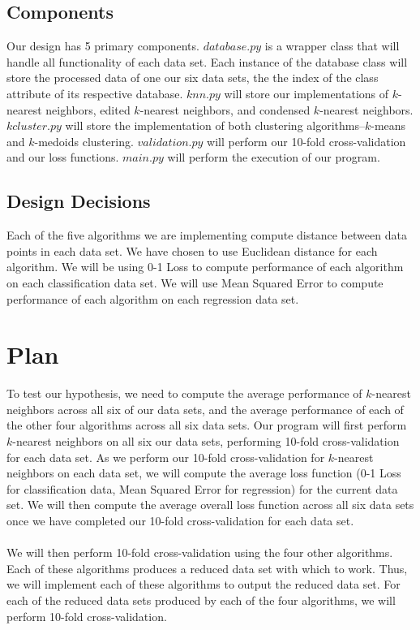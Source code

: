 \documentclass{article}
\begin{document}
\subsection*{Components}
Our design has 5 primary components. $database.py$ is a wrapper class that will handle all functionality of each data set. Each instance of the database class will store the processed data of one our six data sets, the the index of the class attribute of its respective database. $knn.py$ will store our implementations of $k$-nearest neighbors, edited $k$-nearest neighbors, and condensed $k$-nearest neighbors. $kcluster.py$ will store the implementation of both clustering algorithms--$k$-means and $k$-medoids clustering. $validation.py$ will perform our 10-fold cross-validation and our loss functions. $main.py$ will perform the execution of our program. 
\subsection*{Design Decisions}
Each of the five algorithms we are implementing compute distance between data points in each data set. We have chosen to use Euclidean distance for each algorithm. We will be using 0-1 Loss to compute performance of each algorithm on each classification data set. We will use Mean Squared Error to compute performance of each algorithm on each regression data set. %
\section{Plan}
To test our hypothesis, we need to compute the average performance of $k$-nearest neighbors across all six of our data sets, and the average performance of each of the other four algorithms across all six data sets. Our program will first perform $k$-nearest neighbors on all six our data sets, performing 10-fold cross-validation for each data set. As we perform our 10-fold cross-validation for $k$-nearest neighbors on each data set, we will compute the average loss function (0-1 Loss for classification data, Mean Squared Error for regression) for the current data set. We will then compute the average overall loss function across all six data sets once we have completed our 10-fold cross-validation for each data set. \\ \\
We will then perform 10-fold cross-validation using the four other algorithms. Each of these algorithms produces a reduced data set with which to work. Thus, we will implement each of these algorithms to output the reduced data set. For each of the reduced data sets produced by each of the four algorithms, we will perform 10-fold cross-validation.
\end{document}
